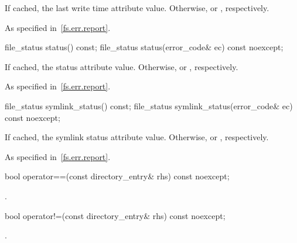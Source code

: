 \begin{itemdescr}
\pnum
\returns If cached, the last write time attribute value.
Otherwise,  or , respectively.

\pnum
\throws As specified in~\ref{fs.err.report}.
\end{itemdescr}

%
\begin{itemdecl}
file_status status() const;
file_status status(error_code& ec) const noexcept;
\end{itemdecl}

\begin{itemdescr}
\pnum
\returns If cached, the status attribute value.
Otherwise,  or , respectively.

\pnum
\throws As specified in~\ref{fs.err.report}.
\end{itemdescr}

%
\begin{itemdecl}
file_status symlink_status() const;
file_status symlink_status(error_code& ec) const noexcept;
\end{itemdecl}

\begin{itemdescr}
\pnum
\returns If cached, the symlink status attribute value.
Otherwise,  or , respectively.

\pnum
\throws As specified in~\ref{fs.err.report}.
\end{itemdescr}

%
\begin{itemdecl}
bool operator==(const directory_entry& rhs) const noexcept;
\end{itemdecl}

\begin{itemdescr}
\pnum
\returns {}.
\end{itemdescr}

%
\begin{itemdecl}
bool operator!=(const directory_entry& rhs) const noexcept;
\end{itemdecl}

\begin{itemdescr}
\pnum
\returns {}.
\end{itemdescr}

